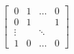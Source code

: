 \documentclass[preview]{standalone}
\begin{document}
\begin{align*}
\begin{bmatrix}\
                      0 & 1 & \dots & 0 \\\
                      0 & 1 &       & 1 \\\
                      \vdots & & \ddots\\\
                      1 & 0 & \dots & 0  \end{bmatrix}
\end{align*}
\end{document}
